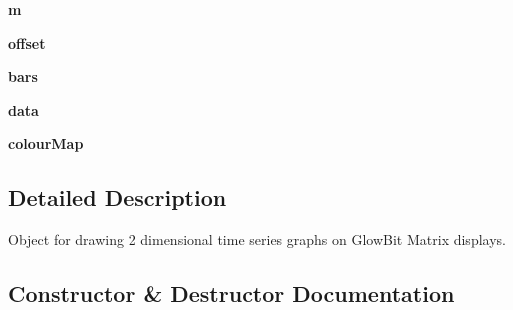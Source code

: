 \begin{DoxyCompactItemize}
{\bfseries m}
\item 
\mbox{\label{classglowbit_1_1glowbitMatrix_1_1graph2D_ac8cfe4f990570e96ee4afd5d9400371b}} 
{\bfseries offset}
\item 
\mbox{\label{classglowbit_1_1glowbitMatrix_1_1graph2D_a3dc420308e355151a6e6d1943a473a94}} 
{\bfseries bars}
\item 
\mbox{\label{classglowbit_1_1glowbitMatrix_1_1graph2D_a5a11fc642d5ad79ab08e5d806b0bab77}} 
{\bfseries data}
\item 
\mbox{\label{classglowbit_1_1glowbitMatrix_1_1graph2D_a116e7d95ab5e0b13ea8f57582bfa15e4}} 
{\bfseries colour\+Map}
\end{DoxyCompactItemize}


\subsection{Detailed Description}
Object for drawing 2 dimensional time series graphs on Glow\+Bit Matrix displays. 



\subsection{Constructor \& Destructor Documentation}
\mbox{\label{classglowbit_1_1glowbitMatrix_1_1graph2D_aaf8deac85157251c95a32172f7069887}} 
